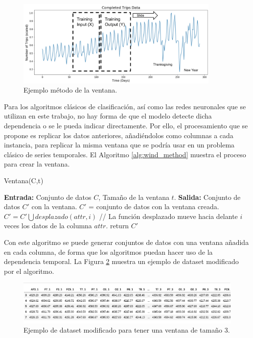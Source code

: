 \begin{figure}[H]
	\centering
	\includegraphics[width=100mm]{imagenes/sliding_window_ts.png}
	\caption{Ejemplo método de la ventana.}
	\label{fig:52}
\end{figure}
\verticalspace

Para los algoritmos clásicos de clasificación, así como las redes neuronales que se utilizan en este trabajo, no hay forma de que el modelo detecte dicha dependencia o se le pueda indicar directamente. Por ello, el procesamiento que se propone es replicar los datos anteriores, añadiéndolos como columnas a cada instancia, para replicar la misma ventana que se podría usar en un problema clásico de series temporales. El Algoritmo \ref{alg:wind_method} muestra el proceso para crear la ventana.\newline

\begin{algorithm}[H]
	\caption{Ventana(C,t)}
	\label{alg:wind_method}
	\begin{algorithmic}[0]
		\State \textbf{Entrada:} Conjunto de datos $C$, Tamaño de la ventana $t$.
		\State \textbf{Salida:} Conjunto de datos $C'$ con la ventana.
		\State $C'$ = conjunto de datos con la ventana creada.
				\State $C' = C' \bigcup desplazado(attr,i)$ // La función desplazado mueve hacia delante $i$ veces los datos de la columna $attr$.
			\EndFor
		\EndFor
		\State return $C'$
	\end{algorithmic}
\end{algorithm}
\verticalspace

Con este algoritmo se puede generar conjuntos de datos con una ventana añadida en cada columna, de forma que los algoritmos puedan hacer uso de la dependencia temporal. La Figura \ref{fig:53} muestra un ejemplo de dataset modificado por el algoritmo.\newline

\begin{figure}[H]
	\centering
	\includegraphics[width=130mm]{imagenes/ventana.png}
	\caption{Ejemplo de dataset modificado para tener una ventana de tamaño 3.}
	\label{fig:53}
\end{figure}
\verticalspace

